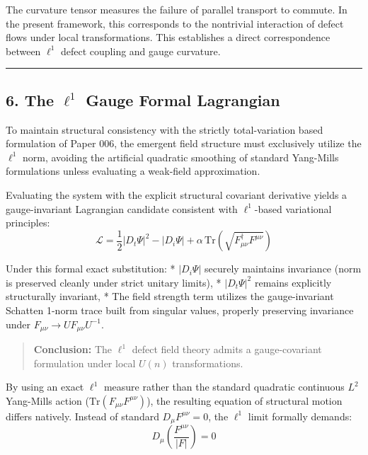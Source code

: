 \documentclass[
]{article}
\begin{document}
The curvature tensor measures the failure of parallel transport to
commute. In the present framework, this corresponds to the nontrivial
interaction of defect flows under local transformations. This
establishes a direct correspondence between \(\ell^1\) defect coupling
and gauge curvature.

\begin{center}\rule{0.5\linewidth}{0.5pt}\end{center}

\subsection{\texorpdfstring{6. The \(\ell^1\) Gauge Formal
Lagrangian}{6. The \textbackslash ell\^{}1 Gauge Formal Lagrangian}}\label{the-ell1-gauge-formal-lagrangian-1}

To maintain structural consistency with the strictly total-variation
based formulation of Paper 006, the emergent field structure must
exclusively utilize the \(\ell^1\) norm, avoiding the artificial
quadratic smoothing of standard Yang-Mills formulations unless
evaluating a weak-field approximation.

Evaluating the system with the explicit structural covariant derivative
yields a gauge-invariant Lagrangian candidate consistent with
\(\ell^1\)-based variational principles:
\[ \mathcal{L} = \frac{1}{2} |D_t \Psi|^2 - |D_i \Psi| + \alpha \, \mathrm{Tr}(\sqrt{F_{\mu\nu}^\dagger F^{\mu\nu}}) \]

Under this formal exact substitution: * \(|D_i \Psi|\) securely
maintains invariance (norm is preserved cleanly under strict unitary
limits), * \(|D_t \Psi|^2\) remains explicitly structurally invariant, *
The field strength term utilizes the gauge-invariant Schatten 1-norm
trace built from singular values, properly preserving invariance under
\(F_{\mu\nu} \rightarrow U F_{\mu\nu} U^{-1}\).

\begin{quote}
\textbf{Conclusion:} The \(\ell^1\) defect field theory admits a
gauge-covariant formulation under local \(U(n)\) transformations.
\end{quote}

By using an exact \(\ell^1\) measure rather than the standard quadratic
continuous \(L^2\) Yang-Mills action
(\(\mathrm{Tr}(F_{\mu\nu} F^{\mu\nu})\)), the resulting equation of
structural motion differs natively. Instead of standard
\(D_\mu F^{\mu\nu} = 0\), the \(\ell^1\) limit formally demands:
\[ D_\mu \left( \frac{F^{\mu\nu}}{|F|} \right) = 0 \]
\end{document}
